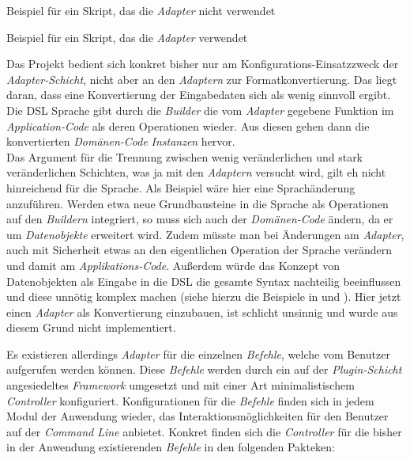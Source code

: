 \vspace{5mm}
\begin{listing}[h]

    \caption{Beispiel für ein Skript, das die \emph{Adapter} nicht verwendet}
    \label{lst:noadapter}
\end{listing}
\vspace{5mm}

\begin{listing}[h]
        
    \caption{Beispiel für ein Skript, das die \emph{Adapter} verwendet}
    \label{lst:adapter}
\end{listing}
\vspace{5mm}

Das Projekt bedient sich konkret bisher nur am Konfigurations-Einsatzzweck der \emph{Adapter-Schicht}, nicht aber an den \emph{Adaptern} zur Formatkonvertierung.
Das liegt daran, dass eine Konvertierung der Eingabedaten sich als wenig sinnvoll ergibt.
Die DSL Sprache gibt durch die \emph{Builder} die vom \emph{Adapter} gegebene Funktion im \emph{Application-Code} als deren Operationen wieder.
Aus diesen gehen dann die konvertierten \emph{Domänen-Code} \emph{Instanzen} hervor.\\
Das Argument für die Trennung zwischen wenig veränderlichen und stark veränderlichen Schichten, was ja mit den \emph{Adaptern} versucht wird, gilt eh nicht hinreichend für die Sprache. 
Als Beispiel wäre hier eine Sprachänderung anzuführen.
Werden etwa neue Grundbausteine in die Sprache als Operationen auf den \emph{Buildern} integriert, so muss sich auch der \emph{Domänen-Code} ändern, da er um \emph{Datenobjekte} erweitert wird.
Zudem müsste man bei Änderungen am \emph{Adapter}, auch mit Sicherheit etwas an den eigentlichen Operation der Sprache verändern und damit am \emph{Applikations-Code}.
Außerdem würde das Konzept von Datenobjekten als Eingabe in die DSL die gesamte Syntax nachteilig beeinflussen und diese unnötig komplex machen (siehe hierzu die Beispiele in  und ).
Hier jetzt einen \emph{Adapter} als Konvertierung einzubauen, ist schlicht unsinnig und wurde aus diesem Grund nicht implementiert.

Es existieren allerdings \emph{Adapter} für die einzelnen \emph{Befehle}, welche vom Benutzer aufgerufen werden können.
Diese \emph{Befehle} werden durch ein auf der \emph{Plugin-Schicht} angesiedeltes \emph{Framework} umgesetzt und mit einer Art minimalistischem \emph{Controller} konfiguriert.
Konfigurationen für die \emph{Befehle} finden sich in jedem Modul der Anwendung wieder, das Interaktionsmöglichkeiten für den Benutzer auf der \emph{Command Line} anbietet.
Konkret finden sich die \emph{Controller} für die bisher in der Anwendung existierenden \emph{Befehle} in den folgenden Pakteken:

